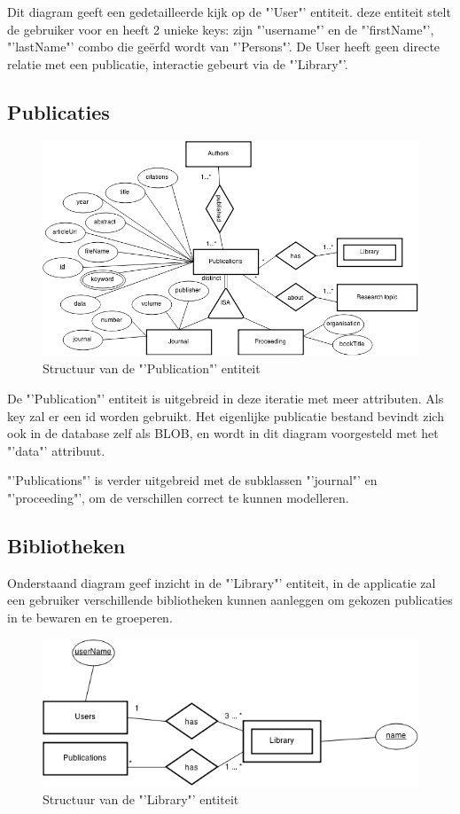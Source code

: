 \documentclass{article}
\begin{document}
Dit diagram geeft een gedetailleerde kijk op de "'User"' entiteit. deze entiteit stelt de gebruiker voor en heeft 2 unieke keys: zijn "'username"' en de "'firstName"', "'lastName"' combo die ge\"erfd wordt van "'Persons"'. De User heeft geen directe relatie met een publicatie, interactie gebeurt via de "'Library"'.

\subsection{Publicaties}

\begin{figure}[!h]
\centering
 \includegraphics[width=145mm]{publication_diagram.png}
 \caption{Structuur van de "'Publication"' entiteit}
 \label{Publication-model}
\end{figure}

De "'Publication"' entiteit is uitgebreid in deze iteratie met meer attributen. Als key zal er een id worden gebruikt. Het eigenlijke publicatie bestand bevindt zich ook in de database zelf als BLOB, en wordt in dit diagram voorgesteld met het "'data"' attribuut.

"'Publications"' is verder uitgebreid met de subklassen "'journal"' en  "'proceeding"', om de verschillen correct te kunnen modelleren.

\subsection{Bibliotheken}

Onderstaand diagram geef inzicht in de "'Library"' entiteit, in de applicatie zal een gebruiker verschillende bibliotheken kunnen aanleggen om gekozen publicaties in te bewaren en te groeperen. 
\begin{figure}[!h]
\centering
 \includegraphics[width=145mm]{library_diagram.png}
 \caption{Structuur van de "'Library"' entiteit}
 \label{Library-model}
\end{figure}
\end{document}
